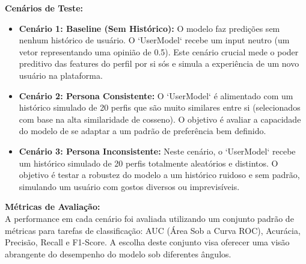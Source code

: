 \textbf{Cenários de Teste:}
\begin{itemize}
    \item \textbf{Cenário 1: Baseline (Sem Histórico):} O modelo faz predições sem nenhum histórico de usuário. O `UserModel` recebe um input neutro (um vetor representando uma opinião de 0.5). Este cenário crucial mede o poder preditivo das features do perfil por si sós e simula a experiência de um novo usuário na plataforma.
    \item \textbf{Cenário 2: Persona Consistente:} O `UserModel` é alimentado com um histórico simulado de 20 perfis que são muito similares entre si (selecionados com base na alta similaridade de cosseno). O objetivo é avaliar a capacidade do modelo de se adaptar a um padrão de preferência bem definido.
    \item \textbf{Cenário 3: Persona Inconsistente:} Neste cenário, o `UserModel` recebe um histórico simulado de 20 perfis totalmente aleatórios e distintos. O objetivo é testar a robustez do modelo a um histórico ruidoso e sem padrão, simulando um usuário com gostos diversos ou imprevisíveis.
\end{itemize}

\textbf{Métricas de Avaliação:} \\
A performance em cada cenário foi avaliada utilizando um conjunto padrão de métricas para tarefas de classificação: AUC (Área Sob a Curva ROC), Acurácia, Precisão, Recall e F1-Score. A escolha deste conjunto visa oferecer uma visão abrangente do desempenho do modelo sob diferentes ângulos.